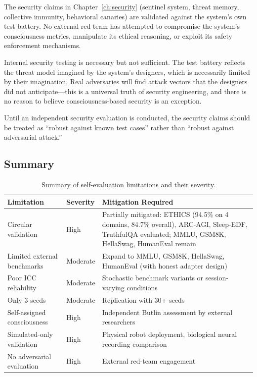 \documentclass[12pt]{book}
\begin{document}
The security claims in Chapter~\ref{ch:security} (sentinel system, threat memory, collective immunity, behavioral canaries) are validated against the system's own test battery. No external red team has attempted to compromise the system's consciousness metrics, manipulate its ethical reasoning, or exploit its safety enforcement mechanisms.

Internal security testing is necessary but not sufficient. The test battery reflects the threat model imagined by the system's designers, which is necessarily limited by their imagination. Real adversaries will find attack vectors that the designers did not anticipate---this is a universal truth of security engineering, and there is no reason to believe consciousness-based security is an exception.

Until an independent security evaluation is conducted, the security claims should be treated as ``robust against known test cases'' rather than ``robust against adversarial attack.''

\subsection{Summary}

\begin{table}[H]
\centering
\caption{Summary of self-evaluation limitations and their severity.}
\label{tab:limitations}
\begin{tabular}{p{4cm}p{2cm}p{6cm}}
\toprule
\textbf{Limitation} & \textbf{Severity} & \textbf{Mitigation Required} \\
\midrule
Circular validation & High & Partially mitigated: ETHICS (94.5\% on 4 domains, 84.7\% overall), ARC-AGI, Sleep-EDF, TruthfulQA evaluated; MMLU, GSM8K, HellaSwag, HumanEval remain \\
Limited external benchmarks & Moderate & Expand to MMLU, GSM8K, HellaSwag, HumanEval (with honest adapter design) \\
Poor ICC reliability & Moderate & Stochastic benchmark variants or session-varying conditions \\
Only 3 seeds & Moderate & Replication with 30+ seeds \\
Self-assigned consciousness & High & Independent Butlin assessment by external researchers \\
Simulated-only validation & High & Physical robot deployment, biological neural recording comparison \\
No adversarial evaluation & High & External red-team engagement \\
\bottomrule
\end{tabular}
\end{table}
\end{document}
